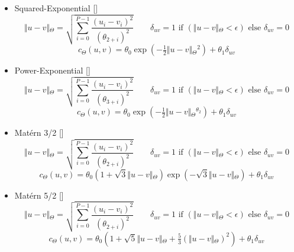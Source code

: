 \begin{itemize}
\item Squared-Exponential []
\[ \Vert{}u-v\Vert{}_\Theta{} = \sqrt{\sum_{i=0}^{P-1} \frac{(u_i - v_i)^2}{(\theta{}_{2+i})^2}} \qquad
 \delta{}_{uv} = 1 \text{ if } (\Vert{}u-v\Vert{}_\Theta{} < \epsilon{}) \textrm{ else } \delta{}_{uv} = 0 \]
\[ c_\Theta{}(u, v) = \theta{}_0 \exp\left({-\tfrac{1}{2} \Vert{}u-v\Vert{}_\Theta{}^2}\right) + \theta{}_1\delta{}_{uv} \]

\item {Power-Exponential}
[]
\[ \Vert{}u-v\Vert{}_\Theta{} = \sqrt{\sum_{i=0}^{P-1} \frac{(u_i - v_i)^2}{(\theta{}_{3+i})^2}} \qquad
 \delta{}_{uv} = 1 \text{ if } (\Vert{}u-v\Vert{}_\Theta{} < \epsilon{}) \textrm{ else } \delta{}_{uv} = 0 \]
\[ c_\Theta{}(u, v) = \theta{}_0 \exp\left({-\tfrac{1}{2} \Vert{}u-v\Vert{}_\Theta{}^{\theta{}_2}}\right) + \theta{}_1\delta{}_{uv} \]

\item {Mat\'{e}rn 3/2}
[]
\[ \Vert{}u-v\Vert{}_\Theta{} = \sqrt{\sum_{i=0}^{P-1} \frac{(u_i - v_i)^2}{(\theta{}_{2+i})^2}} \qquad
 \delta{}_{uv} = 1 \text{ if } (\Vert{}u-v\Vert{}_\Theta{} < \epsilon{}) \textrm{ else } \delta{}_{uv} = 0 \]
\[ c_\Theta{}(u, v) = {\theta{}_0} \left({ 1 + \sqrt{3} \Vert{}u-v\Vert{}_\Theta{} }\right)
\exp \left({ - \sqrt{3} \Vert{}u-v\Vert{}_\Theta{} }\right) + \theta{}_1\delta{}_{uv} \]


\item {Mat\'{e}rn 5/2}
[]
\[ \Vert{}u-v\Vert{}_\Theta{} = \sqrt{\sum_{i=0}^{P-1} \frac{(u_i - v_i)^2}{(\theta{}_{2+i})^2}} \qquad
 \delta{}_{uv} = 1 \text{ if } (\Vert{}u-v\Vert{}_\Theta{} < \epsilon{}) \textrm{ else } \delta{}_{uv} = 0 \]
\[ c_\Theta{}(u, v) = {\theta{}_0} \left({ 1 + \sqrt{5} \Vert{}u-v\Vert{}_\Theta{}
 + \tfrac{5}{3} \left({\Vert{}u-v\Vert{}_\Theta{}}\right)^2  }\right) + \theta{}_1\delta{}_{uv} \]
\end{itemize}

